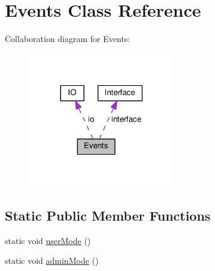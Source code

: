 \hypertarget{classEvents}{}\section{Events Class Reference}
\label{classEvents}


Collaboration diagram for Events\+:\nopagebreak
\begin{figure}[H]
\begin{center}
\leavevmode
\includegraphics[width=182pt]{classEvents__coll__graph}
\end{center}
\end{figure}
\subsection*{Static Public Member Functions}
\begin{DoxyCompactItemize}
\item 
static void \hyperlink{classEvents_a2fdb7c40bf64aa2e23d3d92dc7ab4d35}{user\+Mode} ()
\item 
static void \hyperlink{classEvents_a2217e32868e367ec8d432ce9db2b450e}{admin\+Mode} ()
\end{DoxyCompactItemize}
